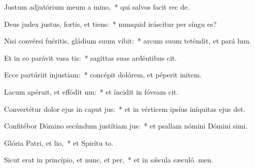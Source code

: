 \item Justum adjutórium meum a mino,~* qui salvos facit rec de.
\item Deus judex justus, fortis, et tiens:~* numquid iráscitur per síngu es?
\item Nisi convérsi fuéritis, gládium suum vibit:~* arcum suum teténdit, et pará lum.
\item Et in eo parávit vasa tis:~* sagíttas suas ardéntibus cit.
\item Ecce partúriit injustiam:~* concépit dolórem, et péperit initem.
\item Lacum apéruit, et effódit um:~* et íncidit in fóveam  cit.
\item Convertétur dolor ejus in caput jus:~* et in vérticem ipsíus iníquitas ejus det.
\item Confitébor Dómino secúndum justítiam jus:~* et psallam nómini Dómini simi.
\item Glória Patri, et lio,~* et Spirítu to.
\item Sicut erat in princípio, et nunc, et per,~* et in sǽcula sæculó. men.
